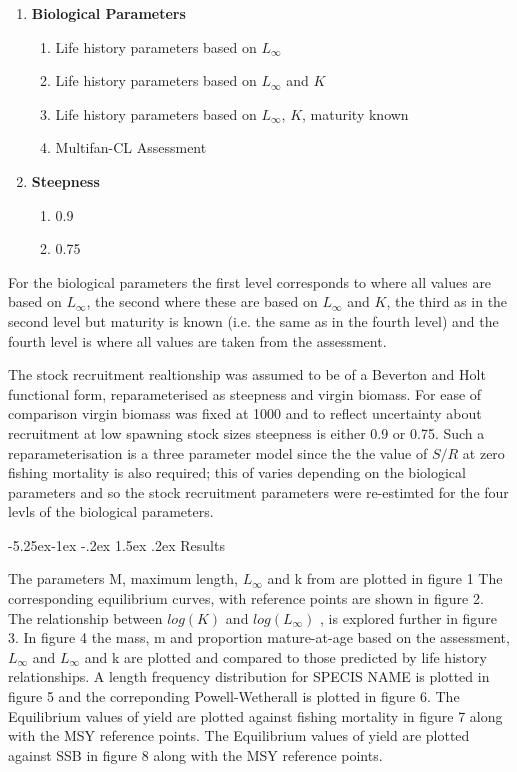 \documentclass[a4paper, 10pt]{article}
\makeatletter
\renewcommand{\section}{\@startsection{section}{1}{\z@}%
 {-5.25ex\@plus -1ex \@minus -.2ex}%
 {1.5ex \@plus .2ex}%
 {\normalfont\bfseries}}
\makeatother
\begin{document}
\begin{enumerate}
  \item \textbf{Biological Parameters}
  \begin{enumerate}
    \item Life history parameters based on $L_{\infty}$
    \item Life history parameters based on $L_{\infty}$ and $K$  
    \item Life history parameters based on $L_{\infty}$, $K$, maturity known  
    \item Multifan-CL Assessment
  \end{enumerate}
  \item \textbf{Steepness}
  \begin{enumerate}
    \item 0.9
    \item 0.75
  \end{enumerate}
\end{enumerate}

For the biological parameters the first level corresponds to where all values are based on $L_{\infty}$, the second where these are based on 
$L_{\infty}$ and $K$, the third as in the second level but maturity is known (i.e. the same as in the fourth level) and the fourth level is where
all values are taken from the assessment.

The stock recruitment realtionship was assumed to be of a Beverton and Holt functional form, reparameterised as steepness and virgin biomass.
For ease of comparison virgin biomass was fixed at 1000 and to reflect uncertainty about recruitment at low spawning stock sizes steepness is either 0.9 or 0.75. 
Such a reparameterisation is a three parameter model since the the value of $S/R$ at zero fishing mortality is also required; this of varies depending on 
the biological parameters and so the stock recruitment parameters were re-estimted for the four levls of the biological parameters. 


\section{Results}\label{Results}

The parameters M, maximum length, $L_{\infty}$ and k from \citep{gislason2010does} are plotted in figure 1
The corresponding equilibrium curves, with reference points are shown in figure 2.
The relationship between $log(K)$ and $log(L_{\infty})$ , is explored further in figure 3.
In figure 4 the mass, m and proportion mature-at-age based on the assessment, $L_{\infty}$ and $L_{\infty}$ and k 
are plotted and compared to those  predicted by life history relationships.
A length frequency distribution for SPECIS NAME is plotted in figure 5 and the correponding Powell-Wetherall is plotted in figure 6.
The Equilibrium values of yield are plotted against fishing mortality in figure 7 along with the MSY reference points.
The Equilibrium values of yield are plotted against SSB in figure 8 along with the MSY reference points. 
\end{document}
